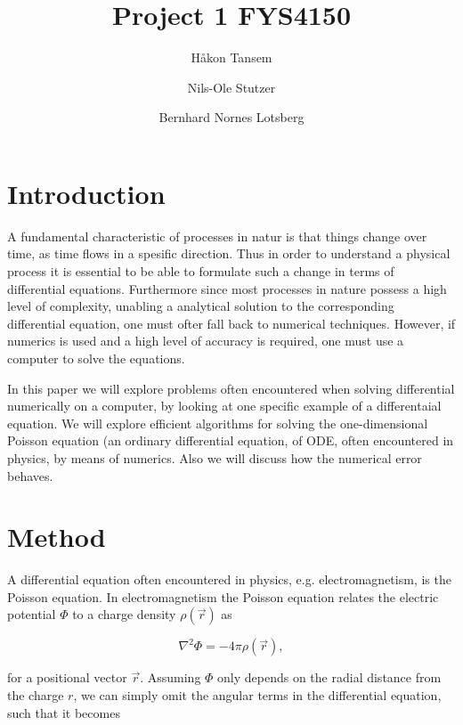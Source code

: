 \documentclass[twocolumn]{aastex62}
\begin{document}
\title{Project 1 FYS4150}




\author[0000-0002-0786-7307]{Håkon Tansem}

\author[0000-0002-0786-7307]{Nils-Ole Stutzer}

\author[0000-0002-0786-7307]{Bernhard Nornes Lotsberg}

\begin{abstract}

\end{abstract}

\section{Introduction} \label{sec:intro}
A fundamental characteristic of processes in natur is that things change over time, as time flows in a spesific direction. Thus in order to understand a physical process it is essential to be able to formulate such a change in terms of differential equations. Furthermore since most processes in nature possess a high level of complexity, unabling a analytical solution to the corresponding differential equation, one must ofter fall back to numerical techniques. However, if numerics is used and a high level of accuracy is required, one must use a computer to solve the equations.

In this paper we will explore problems often encountered when solving differential numerically on a computer, by looking at one specific example of a differentaial equation. We will explore efficient algorithms for solving the one-dimensional Poisson equation (an ordinary differential equation, of ODE, often encountered in physics, by means of numerics. Also we will discuss how the numerical error behaves.
 
\section{Method} \label{sec:method}
A differential equation often encountered in physics, e.g. electromagnetism,  is the Poisson equation. In electromagnetism the Poisson equation relates the electric potential $\Phi$ to a charge density $\rho(\vec{r})$ as 

\begin{equation}
	\nabla^2\Phi = -4\pi\rho(\vec{r}),
\end{equation}

for a positional vector $\vec{r}$. Assuming $\Phi$ only depends on the radial distance from the charge $r$, we can simply omit the angular terms in the differential equation, such that it becomes
 
\end{document}
